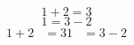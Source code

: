 \documentclass{article}
\begin{document}
	\begin{equation*}
		1+2=3
	\end{equation*}
    \begin{equation*}
        1=3-2
    \end{equation*}
    \begin{align*}
    	1+2& = 3
    	1 &= 3-2
   \end{align*}
\end{document}
